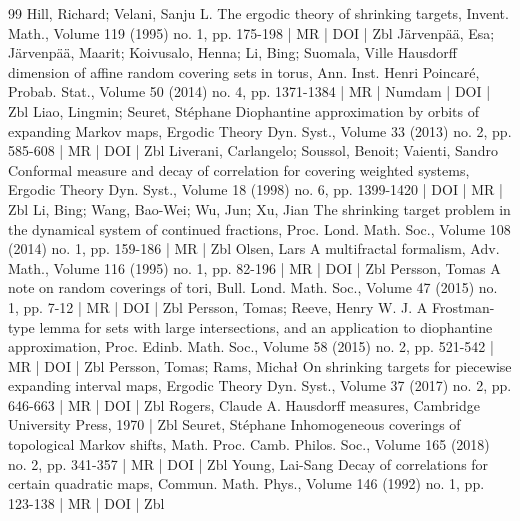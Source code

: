 \begin{thebibliography}{99}
Hill, Richard; Velani, Sanju L. The ergodic theory of shrinking targets, Invent. Math., Volume 119 (1995) no. 1, pp. 175-198 | MR | DOI | Zbl
Järvenpää, Esa; Järvenpää, Maarit; Koivusalo, Henna; Li, Bing; Suomala, Ville Hausdorff dimension of affine random covering sets in torus, Ann. Inst. Henri Poincaré, Probab. Stat., Volume 50 (2014) no. 4, pp. 1371-1384 | MR | Numdam | DOI | Zbl
Liao, Lingmin; Seuret, Stéphane Diophantine approximation by orbits of expanding Markov maps, Ergodic Theory Dyn. Syst., Volume 33 (2013) no. 2, pp. 585-608 | MR | DOI | Zbl
Liverani, Carlangelo; Soussol, Benoit; Vaienti, Sandro Conformal measure and decay of correlation for covering weighted systems, Ergodic Theory Dyn. Syst., Volume 18 (1998) no. 6, pp. 1399-1420 | DOI | MR | Zbl
Li, Bing; Wang, Bao-Wei; Wu, Jun; Xu, Jian The shrinking target problem in the dynamical system of continued fractions, Proc. Lond. Math. Soc., Volume 108 (2014) no. 1, pp. 159-186 | MR | Zbl
Olsen, Lars A multifractal formalism, Adv. Math., Volume 116 (1995) no. 1, pp. 82-196 | MR | DOI | Zbl
Persson, Tomas A note on random coverings of tori, Bull. Lond. Math. Soc., Volume 47 (2015) no. 1, pp. 7-12 | MR | DOI | Zbl
Persson, Tomas; Reeve, Henry W. J. A Frostman-type lemma for sets with large intersections, and an application to diophantine approximation, Proc. Edinb. Math. Soc., Volume 58 (2015) no. 2, pp. 521-542 | MR | DOI | Zbl
Persson, Tomas; Rams, Michał On shrinking targets for piecewise expanding interval maps, Ergodic Theory Dyn. Syst., Volume 37 (2017) no. 2, pp. 646-663 | MR | DOI | Zbl
Rogers, Claude A. Hausdorff measures, Cambridge University Press, 1970 | Zbl
Seuret, Stéphane Inhomogeneous coverings of topological Markov shifts, Math. Proc. Camb. Philos. Soc., Volume 165 (2018) no. 2, pp. 341-357 | MR | DOI | Zbl
Young, Lai-Sang Decay of correlations for certain quadratic maps, Commun. Math. Phys., Volume 146 (1992) no. 1, pp. 123-138 | MR | DOI | Zbl
\end{thebibliography}
